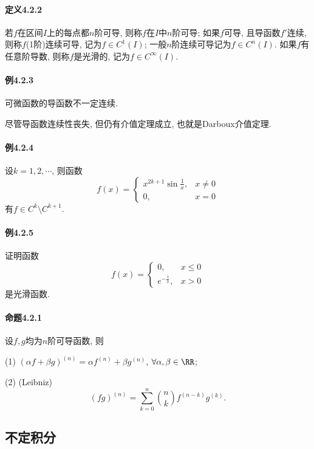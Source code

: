 \paragraph{定义4.2.2}

若$f$在区间$I$上的每点都$n$阶可导, 则称$f$在$I$中$n$阶可导; 如果$f$可导, 且导函数$f'$连续,
则称$f$(1阶)连续可导, 记为$f\in C^{1}(I)$; 一般$n$阶连续可导记为$f\in C^{n}(I)$.
如果$f$有任意阶导数, 则称$f$是光滑的, 记为$f\in C^{\infty}(I)$.

\paragraph{例4.2.3}

可微函数的导函数不一定连续.

尽管导函数连续性丧失, 但仍有介值定理成立, 也就是Darboux介值定理.

\paragraph{例4.2.4}

设$k=1,2,\cdots$, 则函数
\[
f(x)=\begin{cases}
	x^{2k+1}\sin\frac{1}{x}, & x\neq0\\
	0, & x=0
\end{cases}
\]
有$f\in C^{k}\setminus C^{k+1}$.

\paragraph{例4.2.5}

证明函数
\[
f(x)=\begin{cases}
	0, & x\leqslant0\\
	e^{-\frac{1}{x}}, & x>0
\end{cases}
\]
是光滑函数.

\paragraph{命题4.2.1}

设$f,g$均为$n$阶可导函数, 则

(1) $(\alpha f+\beta g)^{(n)}=\alpha f^{(n)}+\beta g^{(n)}$, $\forall\alpha,\beta\in\RR$;

(2) (Leibniz) 
\[
(fg)^{(n)}=\sum_{k=0}^{n}\binom{n}{k}f^{(n-k)}g^{(k)}.
\]


\subsection{不定积分}

